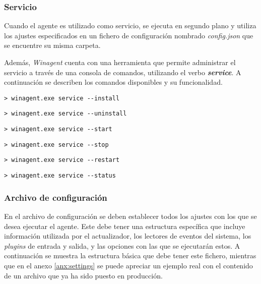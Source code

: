         \subsubsection{Servicio}
        
            Cuando el agente es utilizado como servicio, se ejecuta en segundo plano y utiliza los ajustes especificados en un fichero de configuración nombrado \textit{config.json} que se encuentre su misma carpeta.
            
            Además, \textit{Winagent} cuenta con una herramienta que permite administrar el servicio a través de una consola de comandos, utilizando el verbo \textbf{\textit{service}}. A continuación se describen los comandos disponibles y su funcionalidad.
            
            \begin{lstlisting}[style=batch, caption=Instalar el servicio]
                > winagent.exe service --install
            \end{lstlisting}
            
            \begin{lstlisting}[style=batch, caption=Desinstalar el servicio]
                > winagent.exe service --uninstall
            \end{lstlisting}
            
            \begin{lstlisting}[style=batch, caption=Iniciar el service]
                > winagent.exe service --start
            \end{lstlisting}
            
            \begin{lstlisting}[style=batch, caption=Detener el servicio]
                > winagent.exe service --stop
            \end{lstlisting}
            
            \begin{lstlisting}[style=batch, caption=Reiniciar el servicio]
                > winagent.exe service --restart
            \end{lstlisting}
            
            \begin{lstlisting}[style=batch, caption=Comprobar el estado del servicio]
                > winagent.exe service --status
            \end{lstlisting}
            
        \subsubsection{Archivo de configuración}
            En el archivo de configuración se deben establecer todos los ajustes con los que se desea ejecutar el agente. Este debe tener una estructura específica que incluye información utilizada por el actualizador, los lectores de eventos del sistema, los \textit{plugins} de entrada y salida, y las opciones con las que se ejecutarán estos. A continuación se muestra la estructura básica que debe tener este fichero, mientras que en el anexo \ref{anx:settings} se puede apreciar un ejemplo real con el contenido de un archivo que ya ha sido puesto en producción.
            
